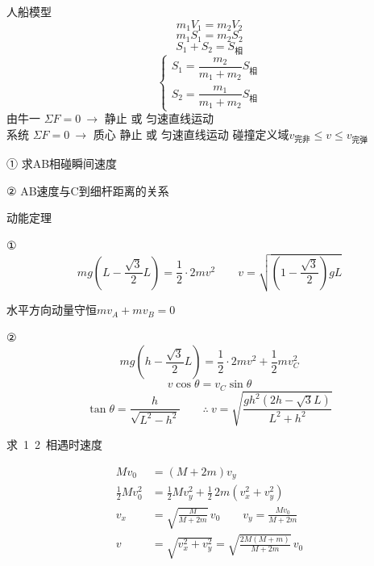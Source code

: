 \noindent 人船模型
\[ m_1V_1=m_2V_2 \]
\[ m_1S_1=m_2S_2 \]
\[ S_1+S_2=S_{\text{相}} \]
\[ \begin{cases} S_1=\dfrac{m_2}{m_1+m_2}S_{\text{相}}\\[6pt] S_2=\dfrac{m_1}{m_1+m_2}S_{\text{相}}\end{cases} \]
\noindent 由牛一 $\Sigma F=0\ \longrightarrow$ 静止 或 匀速直线运动 \\
系统 $\Sigma F=0\ \longrightarrow$ 质心 静止 或 匀速直线运动
碰撞定义域\quad $v_{\text{完非}}\le v\le v_{\text{完弹}}$
\begin{problem}[1.]

① 求AB相碰瞬间速度

② AB速度与C到细杆距离的关系
\begin{solution}
动能定理

① \[ mg\left(L-\frac{\sqrt{3}}{2}L\right)=\frac{1}{2}\cdot 2mv^2 \qquad v=\sqrt{\left(1-\frac{\sqrt{3}}{2}\right)gL} \]

水平方向动量守恒\quad $mv_A+mv_B=0$


② \[ mg\left(h-\frac{\sqrt{3}}{2}L\right)=\frac{1}{2}\cdot 2mv^2+\frac{1}{2}mv_C^2 \]
\[ v\cos\theta=v_C\sin\theta \]
\[ \tan\theta=\frac{h}{\sqrt{L^2-h^2}}\qquad\therefore\ v=\sqrt{\frac{gh^2\left(2h-\sqrt{3}L\right)}{L^2+h^2}} \]
\end{solution}
\end{problem}
\begin{problem}[2.]

求\ 1\ 2\ 相遇时速度
\begin{solution}
\begin{align*}
Mv_0&=(M+2m)v_y\\
\frac{1}{2}Mv_0^2&=\frac{1}{2}Mv_y^2+\frac{1}{2}\,2m\left(v_x^2+v_y^2\right)\\
v_x&=\sqrt{\frac{M}{M+2m}}\,v_0\qquad v_y=\frac{Mv_0}{M+2m}\\
v&=\sqrt{v_x^2+v_y^2}=\sqrt{\frac{2M(M+m)}{M+2m}}\,v_0 %
\end{align*}
\end{solution}
\end{problem}
